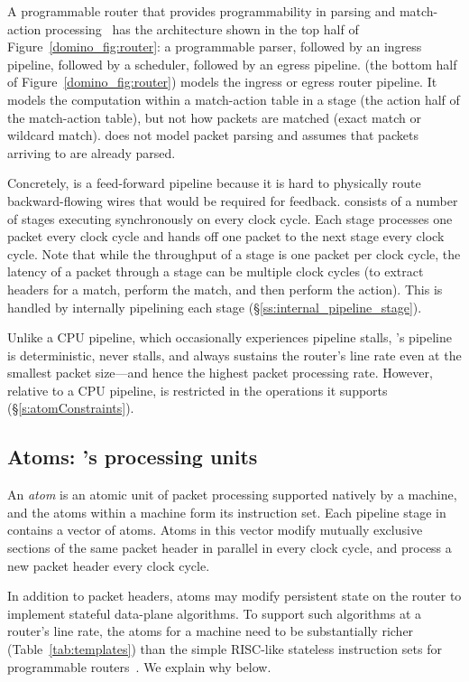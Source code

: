 A programmable router that provides programmability in parsing and match-action
processing~\cite{rmt, xpliant, flexpipe, tofino} has the architecture shown in
the top half of Figure~\ref{domino_fig:router}: a programmable parser, followed
by an ingress pipeline, followed by a scheduler, followed by an egress
pipeline.  \absmachine (the bottom half of Figure~\ref{domino_fig:router})
models the ingress or egress router pipeline.  It models the computation within
a match-action table in a stage (\ie the action half of the match-action
table), but not how packets are matched (\eg exact match or wildcard match).
\absmachine does not model packet parsing and assumes that packets arriving to
\absmachine are already parsed.

 Concretely, \absmachine is a feed-forward pipeline because it is hard to
physically route backward-flowing wires that would be required for feedback.
\absmachine consists of a number of stages executing synchronously on every
clock cycle.  Each stage processes one packet every clock cycle and hands off
one packet to the next stage every clock cycle. Note that while the throughput
of a stage is one packet per clock cycle, the latency of a packet through a
stage can be multiple clock cycles (to extract headers for a match, perform the
match, and then perform the action). This is handled by internally pipelining
each \absmachine stage (\S\ref{ss:internal_pipeline_stage}).

Unlike a CPU pipeline, which occasionally experiences pipeline stalls,
\absmachine's pipeline is deterministic, never stalls, and always sustains the
router's line rate even at the smallest packet size---and hence the highest
packet processing rate. However, relative to a CPU pipeline, \absmachine is
restricted in the operations it supports (\S\ref{s:atomConstraints}).

\subsection{Atoms: \absmachine's processing units}
\label{ss:atoms}
 An {\em atom} is an atomic unit of packet processing supported natively by a
\absmachine machine, and the atoms within a \absmachine machine form its
instruction set. Each pipeline stage in \absmachine contains a vector of atoms.
Atoms in this vector modify mutually exclusive sections of the same packet
header in parallel in every clock cycle, and process a new packet header every
clock cycle.

In addition to packet headers, atoms may modify persistent state on the router
to implement stateful data-plane algorithms. To support such algorithms at
a router's line rate, the atoms for a \absmachine machine need to be
substantially richer (Table~\ref{tab:templates}) than the simple RISC-like
stateless instruction sets for programmable routers~\cite{rmt}. We explain why
below.

